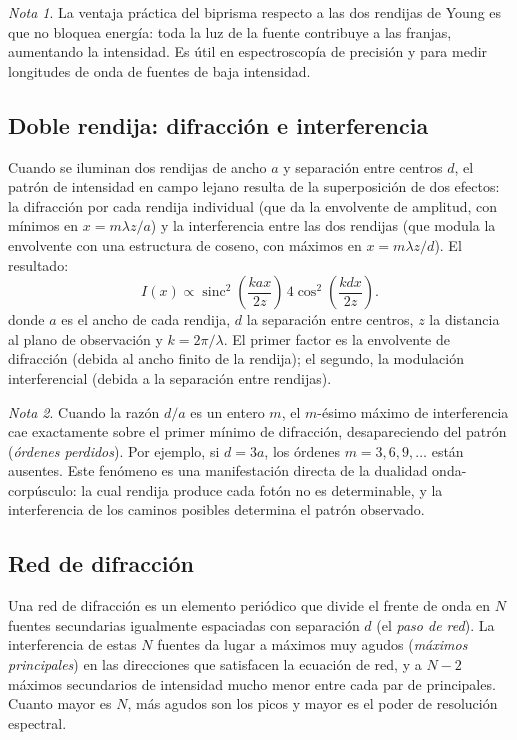 \documentclass[12pt, a4paper]{article}
\theoremstyle{plain}
\theoremstyle{definition}
\theoremstyle{remark}
\newtheorem*{nota}{Nota}
\begin{document}
\begin{nota}
La ventaja práctica del biprisma respecto a las dos rendijas de Young es que
no bloquea energía: toda la luz de la fuente contribuye a las franjas,
aumentando la intensidad. Es útil en espectroscopía de precisión y para medir
longitudes de onda de fuentes de baja intensidad.
\end{nota}

\subsection{Doble rendija: difracción e interferencia}

Cuando se iluminan dos rendijas de ancho $a$ y separación entre centros $d$,
el patrón de intensidad en campo lejano resulta de la superposición de dos
efectos: la difracción por cada rendija individual (que da la envolvente de
amplitud, con mínimos en $x = m\lambda z/a$) y la interferencia entre las
dos rendijas (que modula la envolvente con una estructura de coseno, con
máximos en $x = m\lambda z/d$). El resultado:
\begin{equation}
  I(x)\propto
  \operatorname{sinc}^2\!\left(\frac{kax}{2z}\right)\,
  4\cos^2\!\left(\frac{kdx}{2z}\right).
  \label{eq:doble_rendija_t6}
\end{equation}
donde $a$ es el ancho de cada rendija, $d$ la separación entre centros,
$z$ la distancia al plano de observación y $k=2\pi/\lambda$.
El primer factor es la envolvente de difracción (debida al ancho finito de
la rendija); el segundo, la modulación interferencial (debida a la
separación entre rendijas).

\begin{nota}
Cuando la razón $d/a$ es un entero $m$, el $m$-ésimo máximo de interferencia
cae exactamente sobre el primer mínimo de difracción, desapareciendo del
patrón (\emph{órdenes perdidos}). Por ejemplo, si $d = 3a$, los órdenes $m
= 3, 6, 9, \ldots$ están ausentes. Este fenómeno es una manifestación directa
de la dualidad onda-corpúsculo: la cual rendija produce cada fotón no es
determinable, y la interferencia de los caminos posibles determina el patrón
observado.
\end{nota}

\subsection{Red de difracción}

Una red de difracción es un elemento periódico que divide el frente de onda
en $N$ fuentes secundarias igualmente espaciadas con separación $d$ (el
\emph{paso de red}). La interferencia de estas $N$ fuentes da lugar a
máximos muy agudos (\emph{máximos principales}) en las direcciones que
satisfacen la ecuación de red, y a $N-2$ máximos secundarios de
intensidad mucho menor entre cada par de principales. Cuanto mayor es $N$,
más agudos son los picos y mayor es el poder de resolución espectral.
\end{document}
